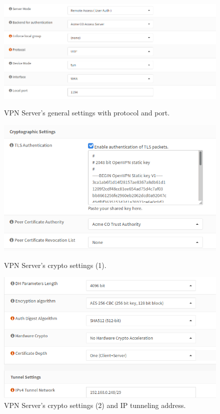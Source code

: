 \begin{figure}[!htb]
\centering
\begin{minipage}{.33\textwidth}
  \centering
  \includegraphics[width=1\textwidth]{vpnserver1.png}
  \caption[a]{VPN Server's general settings with protocol and port.}\label{fig:1}
\end{minipage}%
\begin{minipage}{.33\textwidth}
  \centering
  \includegraphics[width=1\textwidth]{vpnserver2.png}
  \caption[a]{VPN Server's crypto settings (1).}\label{fig:2}
\end{minipage}
\begin{minipage}{.33\textwidth}
  \centering
  \includegraphics[width=1\textwidth]{vpnserver3.png}
  \caption[a]{VPN Server's crypto settings (2) and IP tunneling address.}\label{fig:3}
\end{minipage}
\end{figure}

